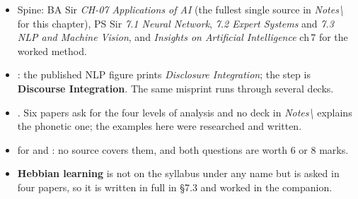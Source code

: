 \begin{itemize}
  \item Spine: BA Sir \emph{CH-07 Applications of AI} (the fullest single source in
        \emph{Notes\textbackslash} for this chapter), PS Sir \emph{7.1 Neural Network},
        \emph{7.2 Expert Systems} and \emph{7.3 NLP and Machine Vision}, and
        \emph{Insights on Artificial Intelligence} ch\,7 for the worked method.
  \item {}: the
        published NLP figure prints \emph{Disclosure Integration}; the step is
        \textbf{Discourse Integration}. The same misprint runs through several decks.
  \item {}. Six papers ask for
        the four levels of analysis and no deck in \emph{Notes\textbackslash} explains
        the phonetic one; the examples here were researched and written.
  \item {} for
         and : no source covers them, and both questions
        are worth 6 or 8 marks.
  \item \textbf{Hebbian learning} is not on the syllabus under any name but is asked in
        four papers, so it is written in full in \S7.3 and worked in the companion.
\end{itemize}
